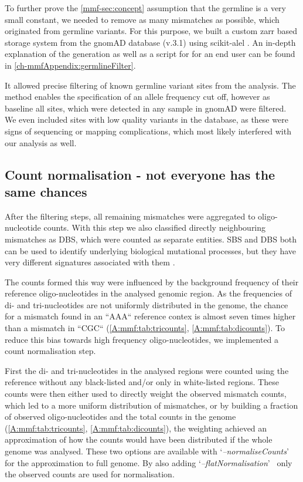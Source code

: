 To further prove the \autoref{mmf-sec:concept} assumption that the germline is a very small constant, we needed to remove as many mismatches as possible, which originated from germline variants. For this purpose, we built a custom zarr \cite{Miles2021} based storage system from the gnomAD database (v.3.1) \cite{Karczewski2020} using scikit-alel \cite{Miles2021a}.
An in-depth explanation of the generation as well as a script for for an end user can be found in \autoref{ch-mmfAppendix:germlineFilter}.

It allowed precise filtering of known germline variant sites from the analysis. The method enables the specification of an allele frequency cut off, however as baseline all sites, which were detected in any sample in gnomAD were filtered. We even included sites with low quality variants in the database, as these were signs of sequencing or mapping complications, which most likely interfered with our analysis as well.


\subsection[Count normalisation]{Count normalisation - not everyone has the same chances}
\label{mmf-sec:countNorm}
After the filtering steps, all remaining mismatches were aggregated to oligo-nucleotide counts. With this step we also classified directly neighbouring mismatches as DBS, which were counted as separate entities. SBS and DBS both can be used to identify underlying biological mutational processes, but they have very different signatures associated with them \cite{Alexandrov2020}.
 
The counts formed this way were influenced by the background frequency of their reference oligo-nucleotides in the analysed genomic region. As the frequencies of di- and tri-nucleotides are not uniformly distributed in the genome, the chance for a mismatch found in an ``AAA`` reference contex is almost seven times higher than a mismatch in ``CGC`` (\autoref{A:mmf:tab:tricounts}, \autoref{A:mmf:tab:dicounts}). To reduce this bias towards high frequency oligo-nucleotides, we implemented a count normalisation step.

First the di- and tri-nucleotides in the analysed regions were counted using the reference without any black-listed and/or only in white-listed regions. These counts were then either used to directly weight the observed mismatch counts, which led to a more uniform distribution of mismatches, or by building a fraction of observed oligo-nucleotides and the total counts in the genome (\autoref{A:mmf:tab:tricounts}, \autoref{A:mmf:tab:dicounts}), the weighting achieved an approximation of how the counts would have been distributed if the whole genome was analysed. These two options are available with \lq\emph{--normaliseCounts}\rq~ for the approximation to full genome. By also adding \lq\emph{--flatNormalisation}\rq~ only the observed counts are used for normalisation.

